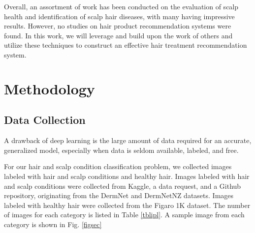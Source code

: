 \documentclass[10pt,twocolumn,letterpaper]{article}
\begin{document}
Overall, an assortment of work has been conducted on the evaluation of scalp health and identification of scalp hair diseases, with many having impressive results. However, no studies on hair product recommendation systems were found. In this work, we will leverage and build upon the work of others and utilize these techniques to construct an effective hair treatment recommendation system.
\section{Methodology}
\subsection{Data Collection}
A drawback of deep learning is the large amount of data required for an accurate, generalized model, especially when data is seldom available, labeled, and free.

For our hair and scalp condition classification problem, we collected images labeled with hair and scalp conditions and healthy hair. Images labeled with hair and scalp conditions were collected from Kaggle, a data request, and a Github repository, originating from the DermNet and DermNetNZ datasets. Images labeled with healthy hair were collected from the Figaro 1K dataset. The number of images for each category is listed in Table \ref{tblipl}. A sample image from each category is shown in Fig. \ref{figsec}
\end{document}
